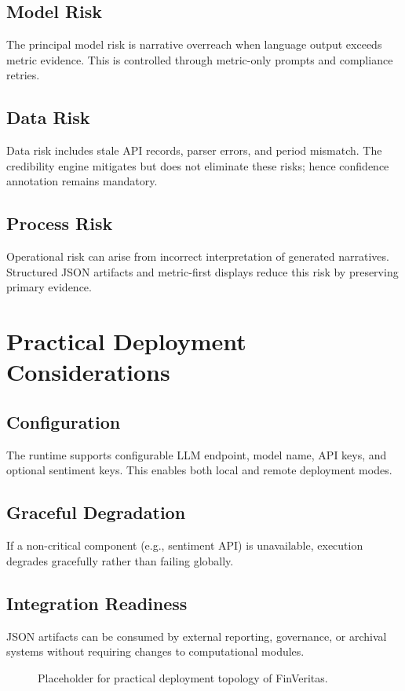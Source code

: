 \documentclass[conference]{IEEEtran}
\begin{document}
\subsection{Model Risk}
The principal model risk is narrative overreach when language output exceeds metric evidence. This is controlled through metric-only prompts and compliance retries.

\subsection{Data Risk}
Data risk includes stale API records, parser errors, and period mismatch. The credibility engine mitigates but does not eliminate these risks; hence confidence annotation remains mandatory.

\subsection{Process Risk}
Operational risk can arise from incorrect interpretation of generated narratives. Structured JSON artifacts and metric-first displays reduce this risk by preserving primary evidence.

\section{Practical Deployment Considerations}
\subsection{Configuration}
The runtime supports configurable LLM endpoint, model name, API keys, and optional sentiment keys. This enables both local and remote deployment modes.

\subsection{Graceful Degradation}
If a non-critical component (e.g., sentiment API) is unavailable, execution degrades gracefully rather than failing globally.

\subsection{Integration Readiness}
JSON artifacts can be consumed by external reporting, governance, or archival systems without requiring changes to computational modules.

\begin{figure}[t]
\centering
{}
\caption{Placeholder for practical deployment topology of FinVeritas.}
\label{fig:deployment_placeholder}
\end{figure}
\end{document}
